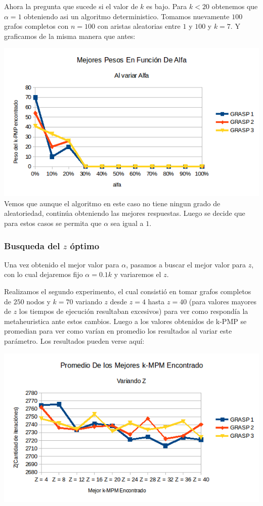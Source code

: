 Ahora la pregunta que sucede si el valor de $k$ es bajo. Para $k < 20$ obtenemos que $\alpha = 1$ obteniendo asi un algoritmo deterministico. Tomamos nuevamente $100$ grafos completos con $n=100$ con aristas aleatorias entre $1$ y $100$ y $k = 7$. Y graficamos de la misma manera que antes:

\includegraphics[scale=0.7]{Ej5/respuestasAlfa3.png}\\

Vemos que aunque el algoritmo en este caso no tiene ningun grado de aleatoriedad, continúa obteniendo las mejores respuestas. Luego se decide que para estos casos se permita que $\alpha$ sea igual a $1$.

\subsubsection{Busqueda del $z$ óptimo}

Una vez obtenido el mejor valor para $\alpha$, pasamos a buscar el mejor valor para $z$, con lo cual dejaremos fijo $\alpha=0.1k$ y variaremos el $z$.

Realizamos el segundo experimento, el cual consistió en tomar grafos completos de $250$ nodos y $k = 70$ variando $z$ desde $z = 4$ hasta $z = 40$ (para valores mayores de $z$ los tiempos de ejecución resultaban excesivos) para ver como respondía la metaheuristica ante estos cambios. Luego a los valores obtenidos de k-PMP se promedian para ver como varían en promedio los resultados al variar este parámetro.
Los resultados pueden verse aquí:

\includegraphics[scale=0.7]{Ej5/promedioZ.png}\\

